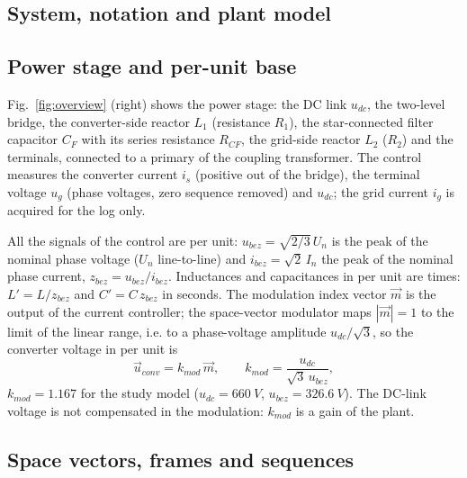 \documentclass[10pt,a4paper]{scrartcl}
\newcommand{\kmod}{k_{mod}}
\begin{document}
\begin{onehalfspace}
\section{System, notation and plant model}
\label{sec:system}

\subsection{Power stage and per-unit base}

Fig.~\ref{fig:overview} (right) shows the power stage: the DC link $u_{dc}$, the two-level bridge, the converter-side reactor $L_1$ (resistance $R_1$), the star-connected filter capacitor $C_F$ with its series resistance $R_{CF}$, the grid-side reactor $L_2$ ($R_2$) and the terminals, connected to a primary of the coupling transformer. The control measures the converter current $i_s$ (positive out of the bridge), the terminal voltage $u_g$ (phase voltages, zero sequence removed) and $u_{dc}$; the grid current $i_g$ is acquired for the log only.

All the signals of the control are per unit: $u_{bez} = \sqrt{2/3}\,U_{n}$ is the peak of the nominal phase voltage ($U_n$ line-to-line) and $i_{bez} = \sqrt{2}\,I_n$ the peak of the nominal phase current, $z_{bez} = u_{bez}/i_{bez}$. Inductances and capacitances in per unit are times: $L' = L/z_{bez}$ and $C' = C\,z_{bez}$ in seconds. The modulation index vector $\vec m$ is the output of the current controller; the space-vector modulator maps $|\vec m| = 1$ to the limit of the linear range, i.e. to a phase-voltage amplitude $u_{dc}/\sqrt3$, so the converter voltage in per unit is
\begin{equation}
\vec u_{conv} = \kmod\,\vec m, \qquad \kmod = \frac{u_{dc}}{\sqrt3\,u_{bez}},
\label{eq:kmod}
\end{equation}
$\kmod = 1.167$ for the study model ($u_{dc} = \SI{660}{V}$, $u_{bez} = \SI{326.6}{V}$). The DC-link voltage is not compensated in the modulation: $\kmod$ is a gain of the plant.

\subsection{Space vectors, frames and sequences}


\end{onehalfspace}
\end{document}

